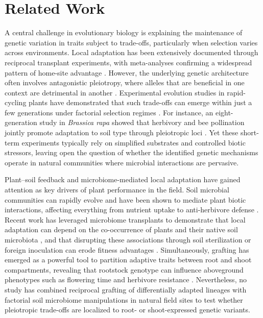 \documentclass{article}
\begin{document}
\section{Related Work}

A central challenge in evolutionary biology is explaining the maintenance of genetic variation in traits subject to trade-offs, particularly when selection varies across environments. Local adaptation has been extensively documented through reciprocal transplant experiments, with meta-analyses confirming a widespread pattern of home-site advantage \cite{Hereford2009}. However, the underlying genetic architecture often involves antagonistic pleiotropy, where alleles that are beneficial in one context are detrimental in another \cite{Rose1982,Anderson2003}. Experimental evolution studies in rapid-cycling plants have demonstrated that such trade-offs can emerge within just a few generations under factorial selection regimes \cite{Franks2007,Agrawal2012}. For instance, an eight-generation study in \textit{Brassica rapa} showed that herbivory and bee pollination jointly promote adaptation to soil type through pleiotropic loci \cite{Johnson2021}. Yet these short-term experiments typically rely on simplified substrates and controlled biotic stressors, leaving open the question of whether the identified genetic mechanisms operate in natural communities where microbial interactions are pervasive.

Plant–soil feedback and microbiome-mediated local adaptation have gained attention as key drivers of plant performance in the field. Soil microbial communities can rapidly evolve and have been shown to mediate plant biotic interactions, affecting everything from nutrient uptake to anti-herbivore defense \cite{Bever2012,Lau2012}. Recent work has leveraged microbiome transplants to demonstrate that local adaptation can depend on the co-occurrence of plants and their native soil microbiota \cite{PankeBuisse2015,Gould2016}, and that disrupting these associations through soil sterilization or foreign inoculation can erode fitness advantages \cite{Wagner2014}. Simultaneously, grafting has emerged as a powerful tool to partition adaptive traits between root and shoot compartments, revealing that rootstock genotype can influence aboveground phenotypes such as flowering time and herbivore resistance \cite{Gomez2018,Purugganan2019}. Nevertheless, no study has combined reciprocal grafting of differentially adapted lineages with factorial soil microbiome manipulations in natural field sites to test whether pleiotropic trade-offs are localized to root- or shoot-expressed genetic variants.
\end{document}

